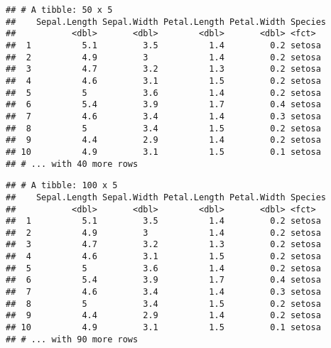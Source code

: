 \documentclass[]{book}
\newenvironment{Shaded}{\begin{snugshade}}{\end{snugshade}}
\newcommand{\KeywordTok}[1]{\textcolor[rgb]{0.13,0.29,0.53}{\textbf{#1}}}
\newcommand{\NormalTok}[1]{#1}
\newcommand{\OperatorTok}[1]{\textcolor[rgb]{0.81,0.36,0.00}{\textbf{#1}}}
\newcommand{\StringTok}[1]{\textcolor[rgb]{0.31,0.60,0.02}{#1}}
\begin{document}
\begin{verbatim}
## # A tibble: 50 x 5
##    Sepal.Length Sepal.Width Petal.Length Petal.Width Species
##           <dbl>       <dbl>        <dbl>       <dbl> <fct>  
##  1          5.1         3.5          1.4         0.2 setosa 
##  2          4.9         3            1.4         0.2 setosa 
##  3          4.7         3.2          1.3         0.2 setosa 
##  4          4.6         3.1          1.5         0.2 setosa 
##  5          5           3.6          1.4         0.2 setosa 
##  6          5.4         3.9          1.7         0.4 setosa 
##  7          4.6         3.4          1.4         0.3 setosa 
##  8          5           3.4          1.5         0.2 setosa 
##  9          4.4         2.9          1.4         0.2 setosa 
## 10          4.9         3.1          1.5         0.1 setosa 
## # ... with 40 more rows
\end{verbatim}

\begin{Shaded}
\end{Shaded}

\begin{verbatim}
## # A tibble: 100 x 5
##    Sepal.Length Sepal.Width Petal.Length Petal.Width Species
##           <dbl>       <dbl>        <dbl>       <dbl> <fct>  
##  1          5.1         3.5          1.4         0.2 setosa 
##  2          4.9         3            1.4         0.2 setosa 
##  3          4.7         3.2          1.3         0.2 setosa 
##  4          4.6         3.1          1.5         0.2 setosa 
##  5          5           3.6          1.4         0.2 setosa 
##  6          5.4         3.9          1.7         0.4 setosa 
##  7          4.6         3.4          1.4         0.3 setosa 
##  8          5           3.4          1.5         0.2 setosa 
##  9          4.4         2.9          1.4         0.2 setosa 
## 10          4.9         3.1          1.5         0.1 setosa 
## # ... with 90 more rows
\end{verbatim}

\begin{Shaded}
\end{Shaded}
\end{document}

